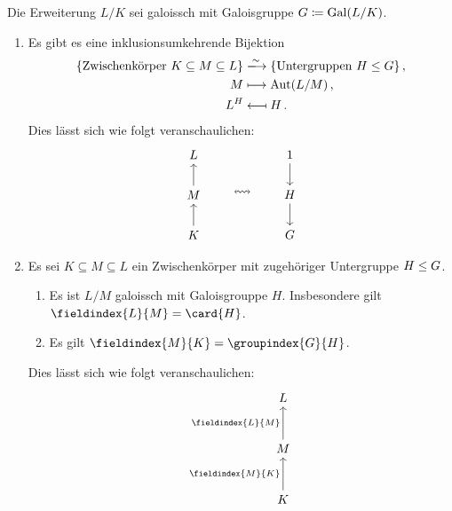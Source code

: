 \begin{theorem}
  Die Erweiterung $L/K$ sei galoissch mit Galoisgruppe $G \coloneqq \operatorname{Gal}(L/K)$.
  \begin{enumerate}
    \item
      Es gibt es eine inklusionsumkehrende Bijektion
      \begin{align*}
                                \{ \text{Zwischenkörper $K \subseteq M \subseteq L$} \}
        &\xlongrightarrow{\sim} \{ \text{Untergruppen $H \subgroup G$} \} \,, \\
                                M
        &\longmapsto            \Aut{L/M} \,, \\
                                L^H
        &\longmapsfrom          H \,.
      \end{align*}
      Dies lässt sich wie folgt veranschaulichen:
      \[
        \begin{tikzcd}
            L
          \\
            M
            \arrow{u}
          \\
            K
            \arrow{u}
        \end{tikzcd}
        \qquad
        \leftrightsquigarrow
        \qquad
        \begin{tikzcd}
            1
            \arrow{d}
          \\
            H
            \arrow{d}
          \\
            G
        \end{tikzcd}
      \]
    \item
      Es sei $K \subseteq M \subseteq L$ ein Zwischenkörper mit zugehöriger Untergruppe $H \mathrel{\leq} G$.
      \begin{enumerate}
        \item
          Es ist $L/M$ galoissch mit Galoisgrouppe $H$.
          Insbesondere gilt $\fieldindex{L}{M} = \card{H}$.
        \item
          Es gilt $\fieldindex{M}{K} = \groupindex{G}{H}$.
      \end{enumerate}
      Dies lässt sich wie folgt veranschaulichen:
      \[
        \begin{tikzcd}[row sep = large]
            L
          \\
            M
            \arrow{u}[left]{\fieldindex{L}{M}}
          \\
            K
            \arrow{u}[left]{\fieldindex{M}{K}}
        \end{tikzcd}
\]
\end{enumerate}
\end{theorem}
